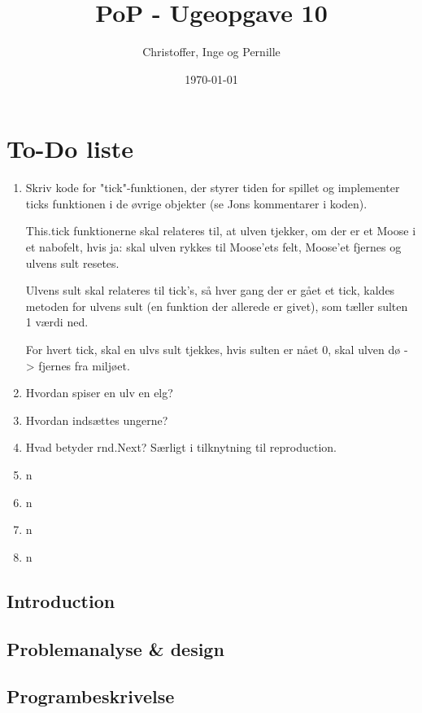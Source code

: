 \documentclass[a4paper]{report}
\title{PoP - Ugeopgave 10}
\author{Christoffer, Inge og Pernille}
\date{\today}
\begin{document}
\maketitle

\section*{To-Do liste}

\begin{enumerate}

\item Skriv kode for "tick"-funktionen, der styrer tiden for spillet og implementer ticks funktionen i de øvrige objekter (se Jons kommentarer i koden).

This.tick funktionerne skal relateres til, at ulven tjekker, om der er et Moose i et nabofelt, hvis ja: skal ulven rykkes til Moose'ets felt, Moose'et fjernes og ulvens sult resetes.

Ulvens sult skal relateres til tick's, så hver gang der er gået et tick, kaldes metoden for ulvens sult (en funktion der allerede er givet), som tæller sulten 1 værdi ned.

For hvert tick, skal en ulvs sult tjekkes, hvis sulten er nået 0, skal ulven dø -> fjernes fra miljøet.
\item Hvordan spiser en ulv en elg?
\item Hvordan indsættes ungerne?
\item Hvad betyder rnd.Next? Særligt i tilknytning til reproduction.
\item n
\item n
\item n
\item n

\end{enumerate}

\newpage

\subsection*{Introduction}

\subsection*{Problemanalyse \& design}

\subsection*{Programbeskrivelse}
\end{document}
